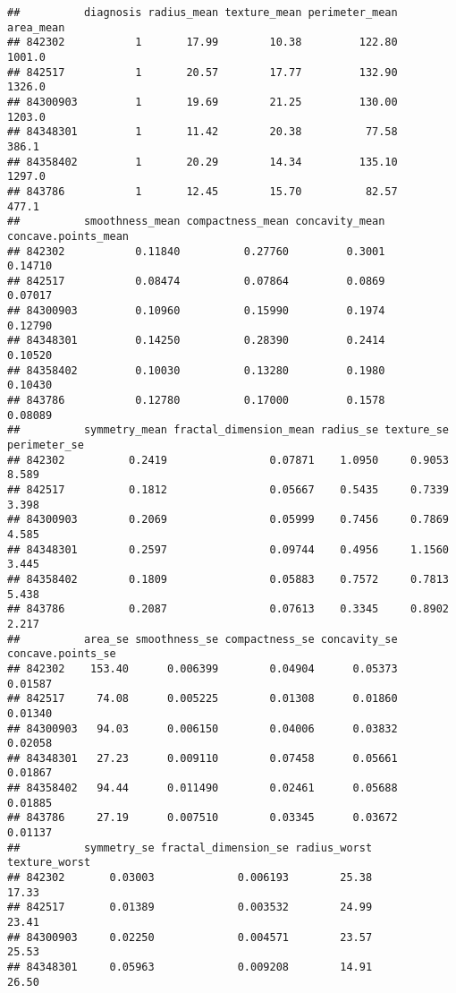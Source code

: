 \documentclass[
]{article}
\begin{document}
\begin{verbatim}
##          diagnosis radius_mean texture_mean perimeter_mean area_mean
## 842302           1       17.99        10.38         122.80    1001.0
## 842517           1       20.57        17.77         132.90    1326.0
## 84300903         1       19.69        21.25         130.00    1203.0
## 84348301         1       11.42        20.38          77.58     386.1
## 84358402         1       20.29        14.34         135.10    1297.0
## 843786           1       12.45        15.70          82.57     477.1
##          smoothness_mean compactness_mean concavity_mean concave.points_mean
## 842302           0.11840          0.27760         0.3001             0.14710
## 842517           0.08474          0.07864         0.0869             0.07017
## 84300903         0.10960          0.15990         0.1974             0.12790
## 84348301         0.14250          0.28390         0.2414             0.10520
## 84358402         0.10030          0.13280         0.1980             0.10430
## 843786           0.12780          0.17000         0.1578             0.08089
##          symmetry_mean fractal_dimension_mean radius_se texture_se perimeter_se
## 842302          0.2419                0.07871    1.0950     0.9053        8.589
## 842517          0.1812                0.05667    0.5435     0.7339        3.398
## 84300903        0.2069                0.05999    0.7456     0.7869        4.585
## 84348301        0.2597                0.09744    0.4956     1.1560        3.445
## 84358402        0.1809                0.05883    0.7572     0.7813        5.438
## 843786          0.2087                0.07613    0.3345     0.8902        2.217
##          area_se smoothness_se compactness_se concavity_se concave.points_se
## 842302    153.40      0.006399        0.04904      0.05373           0.01587
## 842517     74.08      0.005225        0.01308      0.01860           0.01340
## 84300903   94.03      0.006150        0.04006      0.03832           0.02058
## 84348301   27.23      0.009110        0.07458      0.05661           0.01867
## 84358402   94.44      0.011490        0.02461      0.05688           0.01885
## 843786     27.19      0.007510        0.03345      0.03672           0.01137
##          symmetry_se fractal_dimension_se radius_worst texture_worst
## 842302       0.03003             0.006193        25.38         17.33
## 842517       0.01389             0.003532        24.99         23.41
## 84300903     0.02250             0.004571        23.57         25.53
## 84348301     0.05963             0.009208        14.91         26.50

\end{verbatim}
\end{document}
